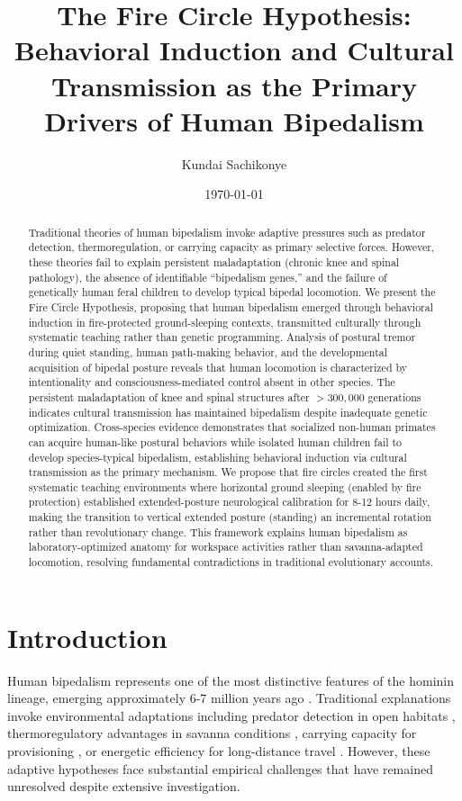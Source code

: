 \documentclass[12pt,a4paper]{article}
\title{The Fire Circle Hypothesis: Behavioral Induction and Cultural Transmission as the Primary Drivers of Human Bipedalism}
\author{Kundai Sachikonye}
\date{\today}
\begin{document}
\maketitle

\begin{abstract}
Traditional theories of human bipedalism invoke adaptive pressures such as predator detection, thermoregulation, or carrying capacity as primary selective forces. However, these theories fail to explain persistent maladaptation (chronic knee and spinal pathology), the absence of identifiable ``bipedalism genes,'' and the failure of genetically human feral children to develop typical bipedal locomotion. We present the Fire Circle Hypothesis, proposing that human bipedalism emerged through behavioral induction in fire-protected ground-sleeping contexts, transmitted culturally through systematic teaching rather than genetic programming. Analysis of postural tremor during quiet standing, human path-making behavior, and the developmental acquisition of bipedal posture reveals that human locomotion is characterized by intentionality and consciousness-mediated control absent in other species. The persistent maladaptation of knee and spinal structures after $>300,000$ generations indicates cultural transmission has maintained bipedalism despite inadequate genetic optimization. Cross-species evidence demonstrates that socialized non-human primates can acquire human-like postural behaviors while isolated human children fail to develop species-typical bipedalism, establishing behavioral induction via cultural transmission as the primary mechanism. We propose that fire circles created the first systematic teaching environments where horizontal ground sleeping (enabled by fire protection) established extended-posture neurological calibration for 8-12 hours daily, making the transition to vertical extended posture (standing) an incremental rotation rather than revolutionary change. This framework explains human bipedalism as laboratory-optimized anatomy for workspace activities rather than savanna-adapted locomotion, resolving fundamental contradictions in traditional evolutionary accounts.
\end{abstract}

\section{Introduction}

Human bipedalism represents one of the most distinctive features of the hominin lineage, emerging approximately 6-7 million years ago \citep{lovejoy1988evolution,richmond2001origin}. Traditional explanations invoke environmental adaptations including predator detection in open habitats \citep{rose1991functional}, thermoregulatory advantages in savanna conditions \citep{wheeler1991thermoregulatory}, carrying capacity for provisioning \citep{lovejoy1981origin}, or energetic efficiency for long-distance travel \citep{rodman1980bioenergetics}. However, these adaptive hypotheses face substantial empirical challenges that have remained unresolved despite extensive investigation.
\end{document}
